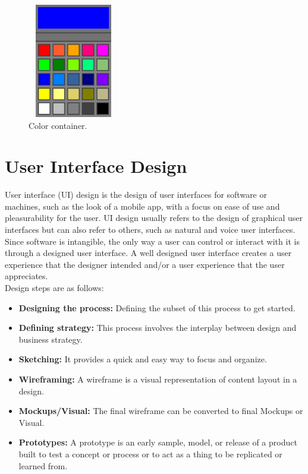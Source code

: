 \documentclass[12pt,a4 paper]{report}
\begin{document}
\begin{figure}[h]
\begin{center}
\includegraphics[width=4cm, height=5cm]{clr.png}
\caption{Color container.}
\end{center}
\end{figure}

\section{User Interface Design}
User interface (UI) design is the design of user interfaces for software or machines, such as the look of a mobile app, with a focus on ease of use and pleasurability for the user. UI design usually refers to the design of graphical user interfaces but can also refer to others, such as natural and voice user interfaces. \\

Since software is intangible, the only way a user can control or interact with it is through a designed user interface. A well designed user interface creates a user experience that the designer intended and/or a user experience that the user appreciates. \\

Design steps are as follows:

\begin{itemize}
\item \textbf{Designing the process:} Defining the subset of this process to get started.
\item \textbf{Defining strategy:} This process involves the interplay between design and business strategy.
\item \textbf{Sketching:} It provides a quick and easy way to focus and organize.
\item \textbf{Wireframing:} A wireframe is a visual representation of content layout in a design.
\item \textbf{Mockups/Visual:} The final wireframe can be converted to final Mockups or Visual.
\item \textbf{Prototypes:} A prototype is an early sample, model, or release of a product built to test a concept or process or to act as a thing to be replicated or learned from.
\end{itemize}
\end{document}
